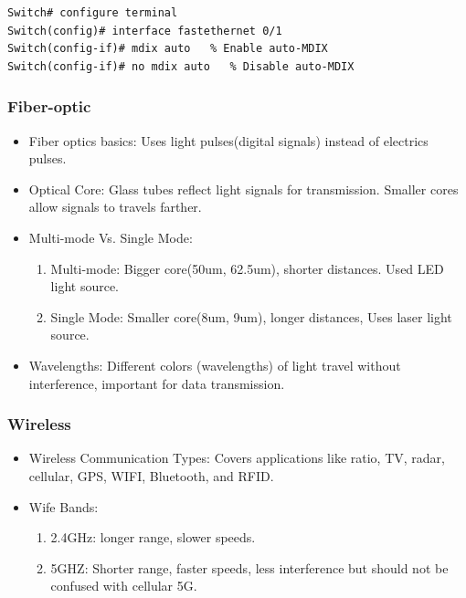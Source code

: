 \documentclass[a4paper,11pt]{article}
\begin{document}
\lstset{language=bash}
\begin{lstlisting}
Switch# configure terminal
Switch(config)# interface fastethernet 0/1
Switch(config-if)# mdix auto   % Enable auto-MDIX
Switch(config-if)# no mdix auto   % Disable auto-MDIX
\end{lstlisting}

\subsubsection{Fiber-optic}
\begin{itemize}
    \item Fiber optics basics: Uses light pulses(digital signals) instead of electrics pulses.\\
    \item Optical Core: Glass tubes reflect light signals for transmission. Smaller cores allow signals to travels farther.\\
    \item Multi-mode Vs. Single Mode:\\
    \begin{enumerate}
        \item Multi-mode: Bigger core(50um, 62.5um), shorter distances. Used LED light source.\\
        \item Single Mode: Smaller core(8um, 9um), longer distances, Uses laser light source.\\
    \end{enumerate}
    \item Wavelengths: Different colors (wavelengths) of light travel without interference, important for data transmission.\\
\end{itemize}

\subsubsection{Wireless}
\begin{itemize}
    \item Wireless Communication Types: Covers applications like ratio, TV, radar, cellular, GPS, WIFI, Bluetooth, and RFID.\\
    \item Wife Bands:\\
    \begin{enumerate}
        \item 2.4GHz: longer range, slower speeds.\\
        \item 5GHZ: Shorter range, faster speeds, less interference but should not be confused with cellular 5G.\\
    \end{enumerate}
\end{itemize}
\end{document}
